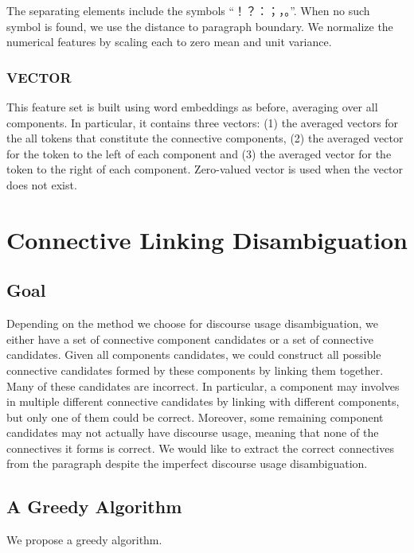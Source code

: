 The separating elements include the symbols ``！？：；，。''.
When no such symbol is found, we use the distance to paragraph boundary.
We normalize the numerical features by scaling each to zero mean and unit variance.

\subsubsection{VECTOR}

This feature set is built using word embeddings as before, averaging over all components.
In particular, it contains three vectors: (1) the averaged vectors
for the all tokens that constitute the connective components, (2) the averaged vector for the
token to the left of each component and (3) the averaged vector for the token to the
right of each component. Zero-valued vector is used when the vector does not exist.

\section{Connective Linking Disambiguation}
\label{c:linking-disambig}

\subsection{Goal}

Depending on the method we choose for discourse usage disambiguation, we
either have a set of connective component candidates or a set of connective
candidates. Given all components candidates, we could construct all possible
connective candidates formed by these components by linking them together.
Many of these candidates are incorrect. In particular, a component may involves in
multiple different connective candidates by linking with different components,
but only one of them could be correct. Moreover, some remaining component
candidates may not actually have discourse usage, meaning that none of
the connectives it forms is correct. We would like to extract the
correct connectives from the paragraph despite the imperfect discourse usage
disambiguation.

\subsection{A Greedy Algorithm}

We propose a greedy algorithm.

